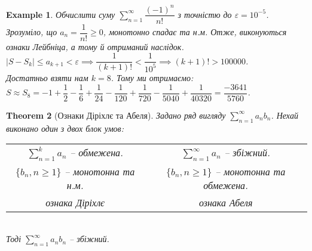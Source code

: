 \documentclass[a4paper, 10pt]{article}
\def\huge{\displaystyle}
\theoremstyle{theoremdd}
\newtheorem{theorem}{Theorem}[subsection]
\theoremstyle{theoremdd}
\theoremstyle{theoremdd}
\theoremstyle{theoremdd}
\theoremstyle{theoremdd}
\newtheorem{example}[theorem]{Example}
\theoremstyle{theoremdd}
\theoremstyle{theoremdd}
\theoremstyle{theoremdd}
\theoremstyle{theoremdd}
\begin{document}
\begin{example}
Обчислити суму $\huge\sum_{n=1}^\infty \dfrac{(-1)^n}{n!}$ з точністю до $\varepsilon = 10^{-5}$.\\
Зрозуміло, що $a_n = \dfrac{1}{n!} \geq 0$, монотонно спадає та н.м. Отже, виконуються ознаки Лейбніца, а тому й отриманий наслідок.\\
$|S-S_k| \leq a_{k+1} < \varepsilon \implies \dfrac{1}{(k+1)!} < \dfrac{1}{10^5} \implies (k+1)! > 100000$.\\
Достатньо взяти нам $k = 8$. Тому ми отримаємо:\\
$S \approx S_8 = -1 + \dfrac{1}{2} - \dfrac{1}{6} + \dfrac{1}{24} - \dfrac{1}{120} + \dfrac{1}{720} - \dfrac{1}{5040} + \dfrac{1}{40320} = \dfrac{-3641}{5760}$.
\end{example}

\begin{theorem}[Ознаки Діріхлє та Абеля]
Задано ряд вигляду $\huge \sum_{n=1}^{\infty} a_n b_n$. Нехай виконано один з двох блок умов:\\
\begin{tabular}{c | c}
$\huge\sum_{n=1}^k a_n$ -- обмежена. & $\huge \sum_{n=1}^{\infty} a_n$ -- збіжний. \\
$\{b_n, n \geq 1\}$ -- монотонна та н.м. & $\{b_n, n \geq 1\}$ -- монотонна та обмежена.\\
\textit{ознака Діріхлє} & \textit{ознака Абеля}
\end{tabular} \\
Тоді $\huge \sum_{n=1}^{\infty} a_n b_n$ -- збіжний.
\end{theorem}
\end{document}
